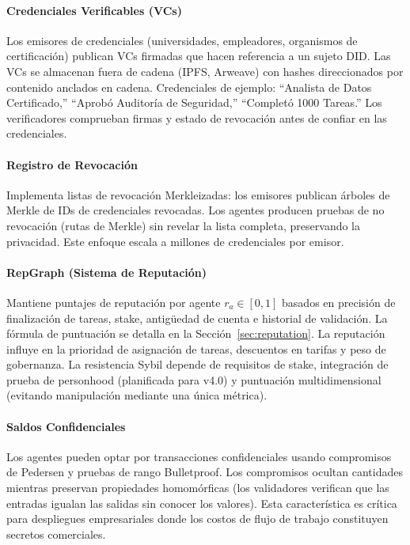 \documentclass[11pt]{article}
\begin{document}
\paragraph{Credenciales Verificables (VCs)} Los emisores de credenciales (universidades, empleadores, organismos de certificación) publican VCs firmadas que hacen referencia a un sujeto DID. Las VCs se almacenan fuera de cadena (IPFS, Arweave) con hashes direccionados por contenido anclados en cadena. Credenciales de ejemplo: ``Analista de Datos Certificado,'' ``Aprobó Auditoría de Seguridad,'' ``Completó 1000 Tareas.'' Los verificadores comprueban firmas y estado de revocación antes de confiar en las credenciales.

\paragraph{Registro de Revocación} Implementa listas de revocación Merkleizadas: los emisores publican árboles de Merkle de IDs de credenciales revocadas. Los agentes producen pruebas de no revocación (rutas de Merkle) sin revelar la lista completa, preservando la privacidad. Este enfoque escala a millones de credenciales por emisor.

\paragraph{RepGraph (Sistema de Reputación)} Mantiene puntajes de reputación por agente $r_a \in [0,1]$ basados en precisión de finalización de tareas, stake, antigüedad de cuenta e historial de validación. La fórmula de puntuación se detalla en la Sección~\ref{sec:reputation}. La reputación influye en la prioridad de asignación de tareas, descuentos en tarifas y peso de gobernanza. La resistencia Sybil depende de requisitos de stake, integración de prueba de personhood (planificada para v4.0) y puntuación multidimensional (evitando manipulación mediante una única métrica).

\paragraph{Saldos Confidenciales} Los agentes pueden optar por transacciones confidenciales usando compromisos de Pedersen y pruebas de rango Bulletproof. Los compromisos ocultan cantidades mientras preservan propiedades homomórficas (los validadores verifican que las entradas igualan las salidas sin conocer los valores). Esta característica es crítica para despliegues empresariales donde los costos de flujo de trabajo constituyen secretos comerciales.
\end{document}
